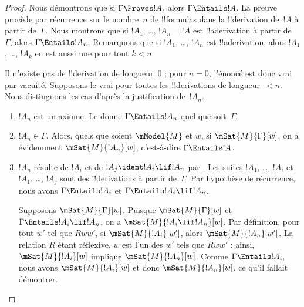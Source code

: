 \documentclass[../../../include/open-logic-section]{subfiles}
\begin{document}
\begin{proof}
  Nous démontrons que si $\Gamma \Proves !A$, alors
  $\Gamma \Entails !A$. La preuve procède par récurrence sur le
  nombre~$n$ de !!{formula}s dans la !!{derivation} de~$!A$ à partir
  de~$\Gamma$. Nous montrons que si $!A_1$, \dots,
  $!A_n = !A$ est !!a{derivation} à partir de~$\Gamma$, alors
  $\Gamma \Entails !A_n$. Remarquons que si $!A_1$, \dots,
  $!A_n$ est !!a{derivation}, alors $!A_1$, \dots,
  $!A_k$ en est aussi une pour tout $k<n$.

  Il n'existe pas de !!{derivation} de longueur~$0$ ; pour $n=0$,
  l'énoncé est donc vrai par vacuité. Supposons-le vrai pour toutes
  les !!{derivation}s de longueur~$<n$. Nous distinguons les cas
  d'après la justification de~$!A_n$.

  \begin{enumerate}
  \item $!A_n$ est un axiome. Le  donne
    $\Gamma \Entails !A_n$ quel que soit~$\Gamma$.
  \item $!A_n \in \Gamma$. Alors, quels que soient $\mModel{M}$ et
    $w$, si $\mSat{M}{\Gamma}[w]$, on a évidemment
    $\mSat{M}{!A_n}[w]$, c'est-à-dire $\Gamma \Entails !A$.
  \item $!A_n$ résulte de $!A_i$ et de
    $!A_j \ident !A_i \lif !A_n$ par \MP{}. Les suites $!A_1$, \dots,
    $!A_i$ et $!A_1$, \dots, $!A_j$ sont des !!{derivation}s à partir
    de~$\Gamma$. Par hypothèse de récurrence, nous avons
    $\Gamma \Entails !A_i$ et $\Gamma \Entails !A_i \lif !A_n$.

    Supposons $\mSat{M}{\Gamma}[w]$. Puisque
    $\mSat{M}{\Gamma}[w]$ et $\Gamma \Entails !A_i \lif !A_n$,
    on a $\mSat{M}{!A_i \lif !A_n}[w]$. Par définition, pour tout
    $w'$ tel que $Rww'$, si $\mSat{M}{!A_i}[w']$, alors
    $\mSat{M}{!A_n}[w']$. La relation $R$ étant réflexive,
    $w$ est l'un des $w'$ tels que $Rww'$ : ainsi,
    $\mSat{M}{!A_i}[w]$ implique $\mSat{M}{!A_n}[w]$. Comme
    $\Gamma \Entails !A_i$, nous avons $\mSat{M}{!A_i}[w]$ et donc
    $\mSat{M}{!A_n}[w]$, ce qu'il fallait démontrer.
  \end{enumerate}
\end{proof}
\end{document}

